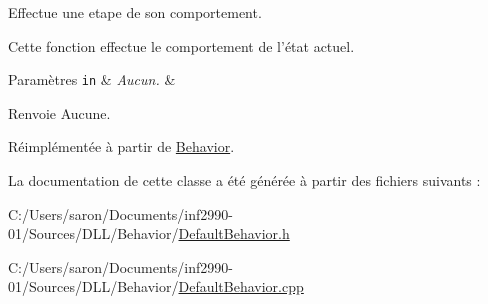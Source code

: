 Effectue une etape de son comportement. 

Cette fonction effectue le comportement de l'état actuel.


\begin{DoxyParams}[1]{Paramètres}
\mbox{\tt in}  & {\em Aucun.} & \\
\hline
\end{DoxyParams}
\begin{DoxyReturn}{Renvoie}
Aucune. 
\end{DoxyReturn}


Réimplémentée à partir de \hyperlink{group__inf2990_gac22f205bc85075ff707ad1f695c18439}{Behavior}.



La documentation de cette classe a été générée à partir des fichiers suivants \-:\begin{DoxyCompactItemize}
\item 
C\-:/\-Users/saron/\-Documents/inf2990-\/01/\-Sources/\-D\-L\-L/\-Behavior/\hyperlink{_default_behavior_8h}{Default\-Behavior.\-h}\item 
C\-:/\-Users/saron/\-Documents/inf2990-\/01/\-Sources/\-D\-L\-L/\-Behavior/\hyperlink{_default_behavior_8cpp}{Default\-Behavior.\-cpp}\end{DoxyCompactItemize}
